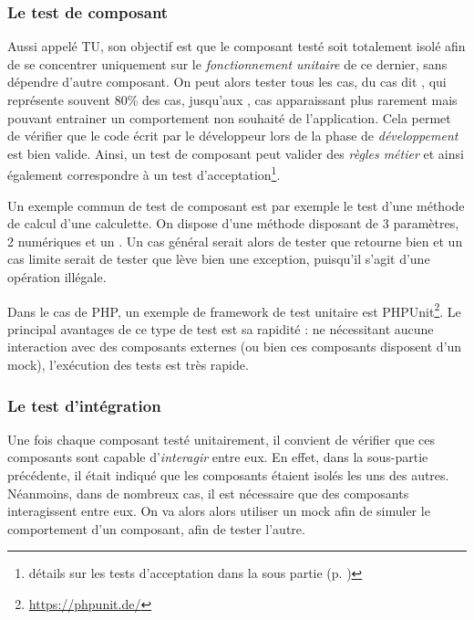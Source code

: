 
\subsubsection{Le test de composant}\label{test-composant}

Aussi appelé \gls{TU}, son objectif est que le composant testé soit totalement isolé afin de se concentrer uniquement sur le \emph{fonctionnement unitaire} de ce dernier, sans dépendre d'autre composant. On peut alors tester tous les cas, du cas dit , qui représente souvent 80\% des cas, jusqu'aux , cas apparaissant plus rarement mais pouvant entrainer un comportement non souhaité de l'application. Cela permet de vérifier que le code écrit par le développeur lors de la phase de \emph{développement} est bien valide. Ainsi, un test de composant peut valider des \emph{règles métier} et ainsi également correspondre à un test d'acceptation\footnote{détails sur les tests d'acceptation dans la sous partie  (p. \pageref{test-acceptation})}.

Un exemple commun de test de composant est par exemple le test d'une méthode de calcul d'une calculette. On dispose d'une méthode  disposant de 3 paramètres, 2  numériques et un . Un cas général serait alors de tester que  retourne bien  et un cas limite serait de tester que  lève bien une exception, puisqu'il s'agit d'une opération illégale.

Dans le cas de \gls{PHP}, un exemple de \gls{framework} de test unitaire est PHPUnit\footnote{\url{https://phpunit.de/}}. Le principal avantages de ce type de test est sa rapidité : ne nécessitant aucune interaction avec des composants externes (ou bien ces composants disposent d'un \gls{mock}), l'exécution des tests est très rapide.

\subsubsection{Le test d'intégration}

Une fois chaque composant testé unitairement, il convient de vérifier que ces composants sont capable d'\emph{interagir} entre eux. En effet, dans la sous-partie précédente, il était indiqué que les composants étaient isolés les uns des autres. Néanmoins, dans de nombreux cas, il est nécessaire que des composants interagissent entre eux. On va alors alors utiliser un \gls{mock} afin de simuler le comportement d'un composant, afin de tester l'autre.

